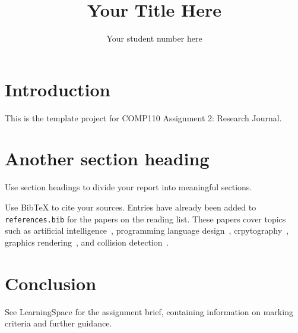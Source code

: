\documentclass{article}
\title{Your Title Here}
\author{Your student number here}
\begin{document}
\maketitle

\section{Introduction}

This is the template project for COMP110 Assignment 2: Research Journal.

\section{Another section heading}

Use section headings to divide your report into meaningful sections.

Use BibTeX to cite your sources. Entries have already been added to \texttt{references.bib} for the papers on the reading list.
These papers cover topics such as artificial intelligence~\cite{turing1950_intelligence, knuth1975_alphabeta}, programming language design~\cite{dijkstra1968_goto}, crpytography~\cite{rivest1978_rsa}, graphics rendering~\cite{phong1975_illumination}, and collision detection~\cite{gilbert1988_gjk}.

\section{Conclusion}

See LearningSpace for the assignment brief, containing information on marking criteria and further guidance.



\end{document}

